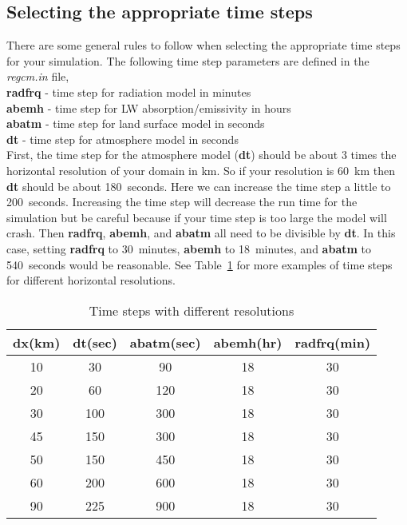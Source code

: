 \subsection{Selecting the appropriate time steps}
There are some general rules to follow when selecting the appropriate time steps
for your simulation.  The following time step parameters are defined in 
the {\it regcm.in} file, \\

{\bf radfrq} - time step for radiation model in minutes \\
\indent
{\bf abemh} - time step for LW absorption/emissivity in hours \\
\indent
{\bf abatm} - time step for land surface model in seconds \\
\indent
{\bf dt} - time step for atmosphere model in seconds\\

\noindent
First, the time step for the atmosphere model ({\bf dt}) should be about 3 times the 
horizontal resolution of your domain in km.  So if your resolution is 60~km then 
{\bf dt} should be about 180~seconds.  Here we can increase the time step a little to 
200~seconds.  Increasing the time step will decrease the run time for the simulation
but be careful because if your time step is too large the model will crash.
Then {\bf radfrq}, {\bf abemh}, and {\bf abatm} all need to be divisible by {\bf dt}.  
In this case, setting  {\bf radfrq} to 30~minutes, {\bf abemh} to 18~minutes, and {\bf abatm} 
to 540~seconds would be reasonable.  See Table~\ref{timestep} for more examples of 
time steps for different horizontal resolutions.


\begin{table}
\begin{center}
\caption{Time steps with different resolutions} \label{timestep}
\begin{tabular}{ccccc}
 dx(km) & dt(sec) & abatm(sec) & abemh(hr) & radfrq(min) \\
\hline\hline
10 & 30  & 90 & 18 & 30 \\
20 & 60  & 120 & 18 & 30 \\
30 & 100  & 300 & 18 & 30 \\
45 & 150 & 300 & 18 & 30 \\
50 & 150 & 450 & 18 & 30 \\
60 & 200 & 600 & 18 & 30 \\
90 & 225 & 900 & 18 & 30 \\
\hline\hline
\end{tabular}
\end{center}
\end{table}



